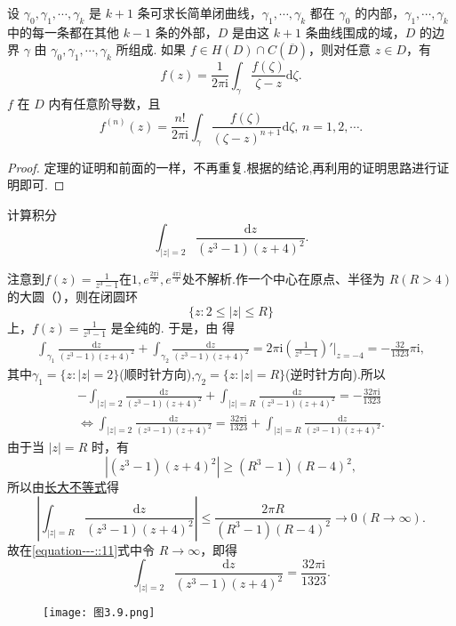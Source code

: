 \documentclass[../../main.tex]{subfiles}
\begin{document}
\begin{theorem}\label{theorem:定理3.4.6}
设 \( \gamma_0, \gamma_1, \cdots, \gamma_k \) 是 \( k + 1 \) 条可求长简单闭曲线，\( \gamma_1, \cdots, \gamma_k \) 都在 \( \gamma_0 \) 的内部，\( \gamma_1, \cdots, \gamma_k \) 中的每一条都在其他 \( k - 1 \) 条的外部，\( D \) 是由这 \( k + 1 \) 条曲线围成的域，\( D \) 的边界 \( \gamma \) 由 \( \gamma_0, \gamma_1, \cdots, \gamma_k \) 所组成. 如果 \( f \in H(D) \cap C(\overline{D}) \)，则对任意 \( z \in D \)，有
\[
f(z) = \frac{1}{2\pi \mathrm{i}} \int_{\gamma} \frac{f(\zeta)}{\zeta - z} \mathrm{d}\zeta.
\]
\( f \) 在 \( D \) 内有任意阶导数，且
\[
f^{(n)}(z) = \frac{n!}{2\pi \mathrm{i}} \int_{\gamma} \frac{f(\zeta)}{(\zeta - z)^{n + 1}} \mathrm{d}\zeta, \, n = 1, 2, \cdots.
\]
\end{theorem}
\begin{proof}
定理的证明和前面的一样，不再重复.根据的结论,再利用的证明思路进行证明即可.
\end{proof}

\begin{example}
计算积分
\[
\int_{|z| = 2} \frac{\mathrm{d}z}{(z^3 - 1)(z + 4)^2}.
\]
\end{example}
\begin{solution}
注意到\( f(z) = \frac{1}{z^3 - 1} \)在$1,e^{\frac{2\pi \mathrm{i}}{3}},e^{\frac{4\pi \mathrm{i}}{3}}$处不解析.作一个中心在原点、半径为 \( R(R > 4) \) 的大圆（），则在闭圆环
\[
\{z: 2 \leqslant |z| \leqslant R\}
\]
上，\( f(z) = \frac{1}{z^3 - 1} \) 是全纯的. 于是，由 得
\begin{align*}
\int_{\gamma_1} \frac{\mathrm{d}z}{(z^3 - 1)(z + 4)^2} + \int_{\gamma_2} \frac{\mathrm{d}z}{(z^3 - 1)(z + 4)^2} 
= 2\pi \mathrm{i} \left( \frac{1}{z^3 - 1} \right)' \bigg|_{z = -4} = -\frac{32}{1323}\pi \mathrm{i},
\end{align*}
其中$\gamma_1=\{z:|z|=2\}$(顺时针方向),$\gamma_2=\{z:|z|=R\}$(逆时针方向).所以
\begin{align}
-\int_{|z|=2}{\frac{\mathrm{d}z}{(z^3-1)(z+4)^2}}+\int_{|z|=R}{\frac{\mathrm{d}z}{(z^3-1)(z+4)^2}}=-\frac{32\pi \mathrm{i}}{1323} \nonumber
\\
\Longleftrightarrow \int_{|z|=2}{\frac{\mathrm{d}z}{(z^3-1)(z+4)^2}}=\frac{32\pi \mathrm{i}}{1323}+\int_{|z|=R}{\frac{\mathrm{d}z}{(z^3-1)(z+4)^2}}.\label{equation---::11}
\end{align}
由于当 \( |z| = R \) 时，有
\[
|(z^3 - 1)(z + 4)^2| \geqslant (R^3 - 1)(R - 4)^2,
\]
所以由\hyperref[proposition:长大不等式]{长大不等式}得
\[
\left| \int_{|z| = R} \frac{\mathrm{d}z}{(z^3 - 1)(z + 4)^2} \right| \leqslant \frac{2\pi R}{(R^3 - 1)(R - 4)^2} \to 0 \, (R \to \infty).
\]
故在\eqref{equation---::11}式中令 \( R \to \infty \)，即得
\[
\int_{|z| = 2} \frac{\mathrm{d}z}{(z^3 - 1)(z + 4)^2} = \frac{32\pi \mathrm{i}}{1323}.
\]
\begin{figure}[H]
\centering
\texttt{[image: 图3.9.png]}
\caption{}
\label{figure:图3.9}
\end{figure}
\end{solution}
\end{document}
